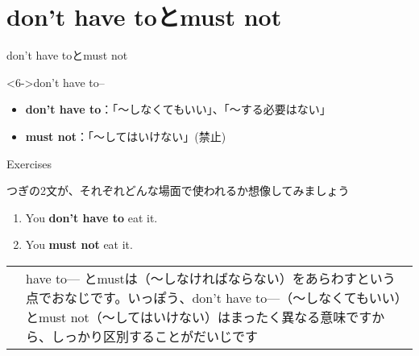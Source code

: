\documentclass[aspectratio=169,xcolor={dvipsnames,table}]{beamer}
\makeatletter
\newcommand{\dnote}[1]{%
    \noindent %
    \begin{tabular}{@{}m{0.13\textwidth}@{}m{0.87\textwidth}@{}}%
        \huge\textdbend &#1%
    \end{tabular}%
    \par %
}
\newcommand{\myaudio}[1]{\href{#1}{\faVolumeUp}}
\makeatother
\begin{document}
\section{don't have toとmust not}
\begin{frame}[plain]{don't have toとmust not}
\Large
 
%
\hfill{}

%
\hfill{}

%
\vfill
%
\hfill{\scriptsize \myaudio{./audio/014_have_to_14.mp3}}
\begin{exampleblock}<6->{don't have to--}
\begin{itemize}[square]\small
 \item   {\bfseries don't have to}：「〜しなくてもいい」、「〜する必要はない」
 \item   {\bfseries must not}：「〜してはいけない」(禁止)
 \end{itemize}
     \end{exampleblock}

\end{frame}
\begin{frame}[plain]{Exercises}
 
つぎの2文が、それぞれどんな場面で使われるか想像してみましょう%
\hfill{\scriptsize \myaudio{./audio/014_have_to_15.mp3}}


\begin{enumerate}
 \item You {\bfseries don't have to} eat it.
 \item You {\bfseries must not} eat it.
\end{enumerate}

\vfill

\pause

\dnote{have to--- とmustは\kenten{義務}（～しなければならない）をあらわすという点でおなじです。いっぽう、don't have to---（～しなくてもいい）とmust not（～してはいけない）はまったく異なる意味ですから、しっかり区別することがだいじです}
\end{frame}
\end{document}
